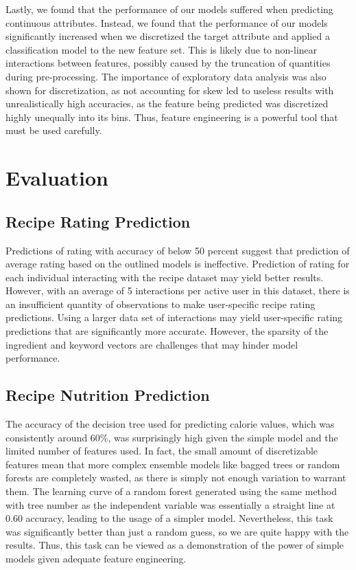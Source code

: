 \documentclass[sigconf]{acmart}
\begin{document}
Lastly, we found that the performance of our models suffered when predicting continuous attributes. Instead, we found that the performance of our models significantly increased when we discretized the target attribute and applied a classification model to the new feature set. This is likely due to non-linear interactions between features, possibly caused by the truncation of quantities during pre-processing. The importance of exploratory data analysis was also shown for discretization, as not accounting for skew led to useless results with unrealistically high accuracies, as the feature being predicted was discretized highly unequally into its bins. Thus, feature engineering is a powerful tool that must be used carefully.
\section{Evaluation}
\subsection{Recipe Rating Prediction}
Predictions of rating with accuracy of below 50 percent suggest that prediction of average rating based on the outlined models is ineffective. Prediction of rating for each individual interacting with the recipe dataset may yield better results. However, with an average of 5 interactions per active user in this dataset, there is an insufficient quantity of observations to make user-specific recipe rating predictions. Using a larger data set of interactions may yield user-specific rating predictions that are significantly more accurate. However, the sparsity of the ingredient and keyword vectors are challenges that may hinder model performance.
\subsection{Recipe Nutrition Prediction}
The accuracy of the decision tree used for predicting calorie values, which was consistently around 60\%, was surprisingly high given the simple model and the limited number of features used. In fact, the small amount of discretizable features mean that more complex ensemble models like bagged trees or random forests are completely wasted, as there is simply not enough variation to warrant them. The learning curve of a random forest generated using the same method with tree number as the independent variable was essentially a straight line at 0.60 accuracy, leading to the usage of a simpler model. Nevertheless, this task was significantly better than just a random guess, so we are quite happy with the results. Thus, this task can be viewed as a demonstration of the power of simple models given adequate feature engineering.
\end{document}
